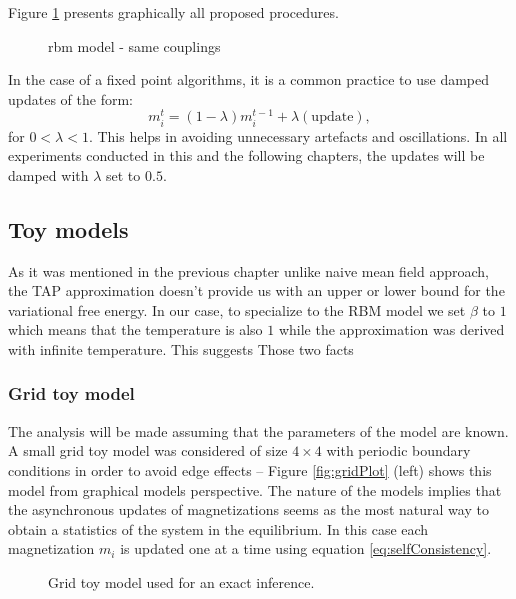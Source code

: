 \documentclass[../report/report.tex]{subfiles}
\begin{document}
Figure \ref{fig:updates} presents graphically all proposed procedures.
\begin{figure}[!htb]
\label{fig:updates}
  \caption[1]{rbm model - same couplings}
\end{figure}
In the case of a fixed point algorithms, it is a common practice to use damped updates \cite{murphy2012machine} of the form:
$$ m_i^{t} = (1- \lambda) m_i^{t-1} + \lambda(\text{update}),$$
for $0 <\lambda<1$. This helps in avoiding unnecessary artefacts and oscillations. In all experiments conducted in this and the following chapters, the updates will be damped with $\lambda$ set to $0.5$.

\subsection{Toy models}
As it was mentioned in the previous chapter unlike naive mean field approach, the TAP approximation doesn't provide us with an upper or lower bound for the variational free energy. In our case, to specialize to the RBM model we set $\beta$ to $1$ which means that the temperature is also $1$ while the approximation was derived with infinite temperature. This suggests  Those two facts

\subsubsection{Grid toy model}
The analysis will be made assuming that the parameters of the model are known. A small grid toy model was considered of size $4 \times 4$ with periodic boundary conditions in order to avoid edge effects -- Figure \ref{fig:gridPlot} (left) shows this model from graphical models perspective. The nature of the models implies that the asynchronous updates of magnetizations seems as the most natural way to obtain a statistics of the system in the equilibrium. In this case each magnetization $m_i$ is updated one at a time using equation \ref{eq:selfConsistency}.

\begin{figure}[!htb]
\begin{center}
  \label{fig:grid}
\end{center}
  \caption[1]{Grid toy model used for an exact inference.}
\end{figure}
\end{document}
